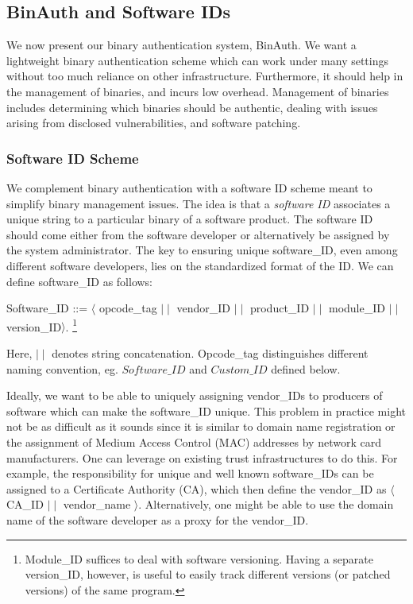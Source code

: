 \subsection{BinAuth and Software IDs}
\label{sec:binauth-scheme}

We now present our binary authentication system, BinAuth.
We want a lightweight binary authentication scheme which can work
under many settings without too much reliance on other infrastructure.
Furthermore, it should help in the management of binaries, and incurs low overhead.
Management of binaries includes determining which binaries should be
authentic, dealing with issues arising from disclosed vulnerabilities,
and software patching.

\subsubsection{Software ID Scheme}


We complement binary authentication with a software ID scheme meant
to simplify binary management issues.
The idea is that a {\em software ID} associates a
unique string to a particular binary of a software product.
The software ID should come either from the software developer
or alternatively be assigned by the system administrator.
The key to ensuring unique software\_ID, even among different
software developers, lies on the standardized format of the ID.
We can define software\_ID as follows:
\begin{center}
\small
Software\_ID ::= $\langle$ opcode\_tag $\mid\mid$ vendor\_ID $\mid\mid$ 
product\_ID $\mid\mid$ module\_ID $\mid\mid$ version\_ID$\rangle$.
\footnote{Module\_ID suffices to deal with software versioning.
Having a separate version\_ID, however, is useful to easily
track different versions (or patched versions) of the same program.}
\end{center}
\noindent 
Here, $\mid\mid$ denotes string concatenation.
Opcode\_tag distinguishes different naming convention, eg.
$Software\_ID$ and $Custom\_ID$ defined below.

Ideally, we want to be able to uniquely assigning vendor\_IDs to
producers of software which can make the software\_ID unique.
This problem in practice might not be as difficult as it sounds since
it is similar to domain name registration or the assignment
of Medium Access Control (MAC) addresses by network card manufacturers.
One can leverage on existing trust infrastructures to do this.
For example, the responsibility for unique and well known software\_IDs
can be assigned to a Certificate Authority (CA), which then 
define the vendor\_ID as $\langle$ CA\_ID $\mid\mid$ vendor\_name $\rangle$. 
Alternatively, one might be able to use the domain name of the 
software developer as a proxy for the vendor\_ID.

